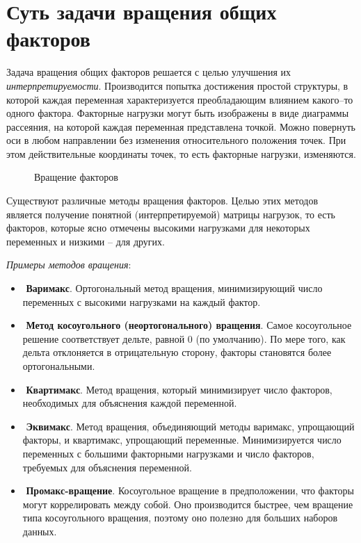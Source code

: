 \documentclass[a4paper, 12pt]{article}
\begin{document}
\section{Суть задачи вращения общих факторов}
Задача вращения общих факторов решается с целью улучшения их {\it интерпретируемости}. Производится попытка достижения простой структуры, в которой каждая переменная характеризуется преобладающим влиянием какого–то одного фактора. Факторные нагрузки могут быть изображены в виде диаграммы рассеяния, на которой каждая переменная представлена точкой. Можно повернуть оси в любом направлении без изменения относительного положения точек. При этом действительные координаты точек, то есть факторные нагрузки, изменяются. 
\begin{figure}[h!]
    \caption{Вращение факторов}
    \label{ris:image}
    \end{figure}

Существуют различные методы вращения факторов. Целью этих методов является получение понятной (интерпретируемой) матрицы нагрузок, то есть факторов, которые ясно отмечены высокими нагрузками для некоторых переменных и низкими -- для других. 

{\it Примеры методов вращения}:
\begin{itemize}
    \item­	\textbf{Варимакс}. Ортогональный метод вращения, минимизирующий число переменных с высокими нагрузками на каждый фактор. 
    \item ­	\textbf{Метод косоугольного (неортогонального) вращения}. Самое косоугольное решение соответствует дельте, равной 0 (по умолчанию). По мере того, как дельта отклоняется в отрицательную сторону, факторы становятся более ортогональными.
    \item ­	\textbf{Квартимакс}. Метод вращения, который минимизирует число факторов, необходимых для объяснения каждой переменной.
    \item ­	\textbf{Эквимакс}. Метод вращения, объединяющий методы варимакс, упрощающий факторы, и квартимакс, упрощающий переменные. Минимизируется число переменных с большими факторными нагрузками и число факторов, требуемых для объяснения переменной.
    \item ­	\textbf{Промакс-вращение}. Косоугольное вращение в предположении, что факторы могут коррелировать между собой. Оно производится быстрее, чем вращение типа косоугольного вращения, поэтому оно полезно для больших наборов данных.
\end{itemize}
\end{document}
